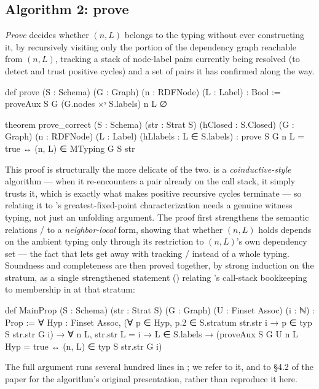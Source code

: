 \subsection{Algorithm 2: prove}

\emph{Prove} decides whether $(n, L)$ belongs to the typing without ever
constructing it, by recursively visiting only the portion of the
dependency graph reachable from $(n, L)$, tracking a stack of
node-label pairs currently being resolved (to detect and trust positive
cycles) and a set  of pairs it has confirmed along the way.

\begin{leanlisting}
def prove (S : Schema) (G : Graph) (n : RDFNode) (L : Label) : Bool :=
  proveAux S G (G.nodes ×ˢ S.labels) n L ∅

theorem prove_correct (S : Schema) (str : Strat S) (hClosed : S.Closed)
    (G : Graph) (n : RDFNode) (L : Label) (hLlabels : L ∈ S.labels) :
    prove S G n L = true ↔ (n, L) ∈ MTyping G S str
\end{leanlisting}

This proof is structurally the more delicate of the two.  is
a \emph{coinductive-style} algorithm --- when it re-encounters a pair already
on the call stack, it simply trusts it, which is exactly what makes
positive recursive cycles terminate --- so relating it to 's
greatest-fixed-point characterization needs a genuine witness typing, not
just an unfolding argument. The proof first strengthens the semantic
relations / to a \emph{neighbor-local} form,
showing that whether $(n, L)$ holds depends on the ambient typing only
through its restriction to $(n, L)$'s own dependency set --- the fact that
lets  get away with tracking / instead of a
whole typing. Soundness and completeness are then proved together, by
strong induction on the stratum, as a single strengthened statement
() relating 's call-stack bookkeeping to
membership in  at that stratum:

\begin{leanlisting}
def MainProp (S : Schema) (str : Strat S) (G : Graph) (U : Finset Assoc)
    (i : ℕ) : Prop :=
  ∀ Hyp : Finset Assoc,
    (∀ p ∈ Hyp, p.2 ∈ S.stratum str.str i → p ∈ typ S str.str G i) →
    ∀ n L, str.str L = i → L ∈ S.labels →
      (proveAux S G U n L Hyp = true ↔ (n, L) ∈ typ S str.str G i)
\end{leanlisting}

The full argument runs several hundred lines in ;
we refer to it, and to \S4.2 of the paper for the algorithm's original
presentation, rather than reproduce it here.

